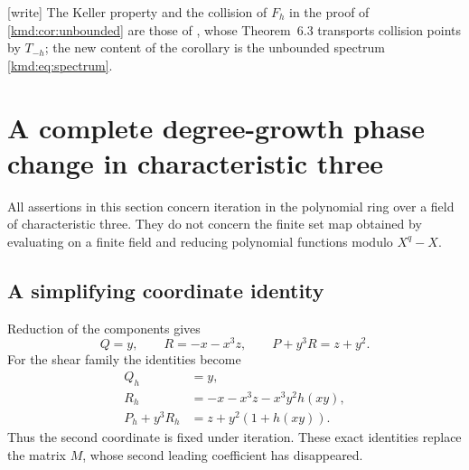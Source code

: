 \documentclass[11pt,a4paper]{article}
\numberwithin{equation}{section}
\theoremstyle{definition}
\theoremstyle{remark}
\newcommand{\wtag}{\textup{[write]}}%
\begin{document}
\noindent\wtag{} The Keller property and the collision of $F_h$ in the
proof of \cref{kmd:cor:unbounded} are those of \cite{weighted}, whose
Theorem~6.3 transports collision points by $T_{-h}$; the new content
of the corollary is the unbounded spectrum \eqref{kmd:eq:spectrum}.

\section{A complete degree-growth phase change in characteristic three}
\label{kmd:sec:char3}

All assertions in this section concern iteration in the polynomial
ring over a field of characteristic three. They do not concern the
finite set map obtained by evaluating on a finite field and reducing
polynomial functions modulo $X^q-X$.

\subsection{A simplifying coordinate identity}
Reduction of the components gives
\begin{equation}
 Q=y,\qquad R=-x-x^3z,\qquad P+y^3R=z+y^2.
 \label{kmd:eq:char3-base}
\end{equation}
For the shear family the identities become
\begin{align}
 Q_h&=y,\nonumber\\
 R_h&=-x-x^3z-x^3y^2h(xy),\label{kmd:eq:char3-shear}\\
 P_h+y^3R_h&=z+y^2(1+h(xy)).\nonumber
\end{align}
Thus the second coordinate is fixed under iteration. These exact
identities replace the matrix $M$, whose second leading coefficient
has disappeared.
\end{document}
